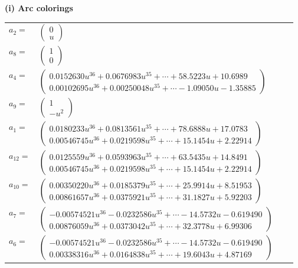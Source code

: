 \documentclass[1p]{elsarticle_modified}
\theoremstyle{definition}
\begin{document}
\flushleft \textbf{(i) Arc colorings}\\
\begin{tabular}{m{7pt} m{180pt} m{7pt} m{180pt} }
\flushright $a_{2}=$&$\begin{pmatrix}0\\u\end{pmatrix}$ \\
\flushright $a_{8}=$&$\begin{pmatrix}1\\0\end{pmatrix}$ \\
\flushright $a_{4}=$&$\begin{pmatrix}0.0152630 u^{36}+0.0676983 u^{35}+\cdots+58.5223 u+10.6989\\0.00102695 u^{36}+0.00250048 u^{35}+\cdots-1.09050 u-1.35885\end{pmatrix}$ \\
\flushright $a_{9}=$&$\begin{pmatrix}1\\- u^2\end{pmatrix}$ \\
\flushright $a_{1}=$&$\begin{pmatrix}0.0180233 u^{36}+0.0813561 u^{35}+\cdots+78.6888 u+17.0783\\0.00546745 u^{36}+0.0219598 u^{35}+\cdots+15.1454 u+2.22914\end{pmatrix}$ \\
\flushright $a_{12}=$&$\begin{pmatrix}0.0125559 u^{36}+0.0593963 u^{35}+\cdots+63.5435 u+14.8491\\0.00546745 u^{36}+0.0219598 u^{35}+\cdots+15.1454 u+2.22914\end{pmatrix}$ \\
\flushright $a_{10}=$&$\begin{pmatrix}0.00350220 u^{36}+0.0185379 u^{35}+\cdots+25.9914 u+8.51953\\0.00861657 u^{36}+0.0375921 u^{35}+\cdots+31.1827 u+5.92203\end{pmatrix}$ \\
\flushright $a_{7}=$&$\begin{pmatrix}-0.00574521 u^{36}-0.0232586 u^{35}+\cdots-14.5732 u-0.619490\\0.00876059 u^{36}+0.0373042 u^{35}+\cdots+32.3778 u+6.99306\end{pmatrix}$ \\
\flushright $a_{6}=$&$\begin{pmatrix}-0.00574521 u^{36}-0.0232586 u^{35}+\cdots-14.5732 u-0.619490\\0.00338316 u^{36}+0.0164838 u^{35}+\cdots+19.6043 u+4.87169\end{pmatrix}$ \\

\end{tabular}
\end{document}
